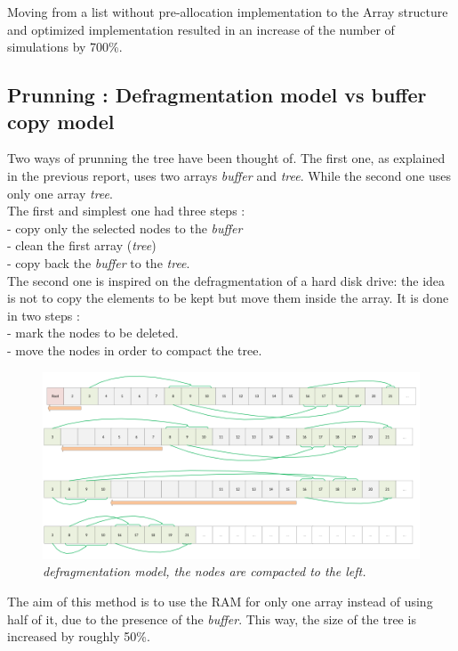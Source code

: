 Moving from a list without pre-allocation implementation to the Array structure and optimized implementation resulted in an increase of the number of simulations by 700\%.

\subsection{Prunning : Defragmentation model vs buffer copy model}

Two ways of prunning the tree have been thought of. The first one, as explained in the previous report, uses two arrays \textit{buffer} and \textit{tree}. While the second one uses only one array \textit{tree}.
\medskip\\
The first and simplest one had three steps : \\
- copy only the selected nodes to the \textit{buffer} \\
- clean the first array (\textit{tree}) \\
- copy back the \textit{buffer} to the \textit{tree}.
\medskip\\
The second one is inspired on the defragmentation of a hard disk drive: the idea is not to copy the elements to be kept but move them inside the array. It is done in two steps : \\
- mark the nodes to be deleted. \\
- move the nodes in order to compact the tree.
\begin{figure}[H] 
\centerline{\includegraphics[width=\textwidth]{Optimisations/array.png}}
\caption{\label{fig:Defrag}\textit{defragmentation model, the nodes are compacted to the left.}}
\end{figure}
The aim of this method is to use the RAM for only one array instead of using half of it, due to the presence of the \textit{buffer}. This way, the size of the tree is increased by roughly 50\%.

